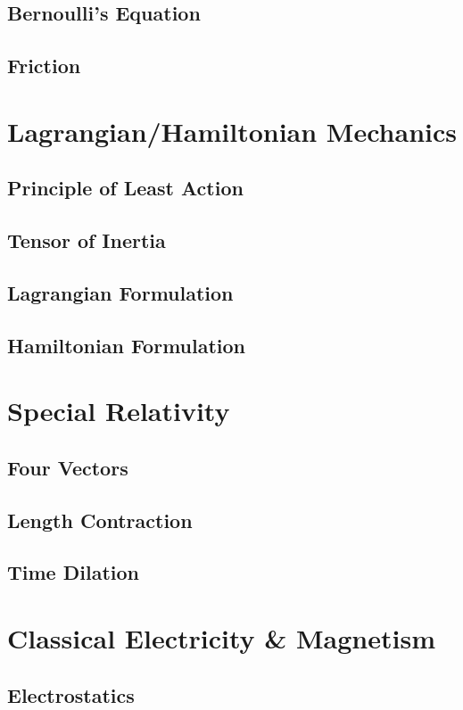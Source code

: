 \documentclass[oneside]{book}
\numberwithin{figure}{section}
\numberwithin{equation}{section}
\theoremstyle{definition}
\begin{document}
	\section{Bernoulli's Equation}
	\section{Friction}

	\chapter{Lagrangian/Hamiltonian Mechanics}
	\section{Principle of Least Action}
	\section{Tensor of Inertia}
	\section{Lagrangian Formulation}
	\section{Hamiltonian Formulation}

	\chapter{Special Relativity}
	\section{Four Vectors}
	\section{Length Contraction}
	\section{Time Dilation}

	\chapter{Classical Electricity \& Magnetism}
	\section{Electrostatics}
\end{document}
